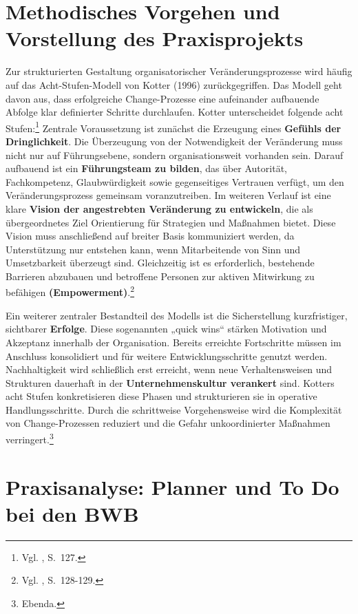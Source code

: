 \documentclass[
    12pt, 
    a4paper,
    ]{scrartcl} %
\begin{document}
\section{Methodisches Vorgehen und Vorstellung des Praxisprojekts}
Zur strukturierten Gestaltung organisatorischer Veränderungsprozesse wird häufig auf das Acht-Stufen-Modell von Kotter (1996) zurückgegriffen. Das Modell geht davon aus, dass erfolgreiche Change-Prozesse eine aufeinander aufbauende Abfolge klar definierter Schritte durchlaufen. Kotter unterscheidet folgende acht Stufen:\footnote{Vgl. \cite{Rosenstiel_ChangeManagement}, S.~127.} 
Zentrale Voraussetzung ist zunächst die Erzeugung eines \textbf{Gefühls der Dringlichkeit}. Die Überzeugung von der Notwendigkeit der Veränderung muss nicht nur auf Führungsebene, sondern organisationsweit vorhanden sein. Darauf aufbauend ist ein \textbf{Führungsteam zu bilden}, das über Autorität, Fachkompetenz, Glaubwürdigkeit sowie gegenseitiges Vertrauen verfügt, um den Veränderungsprozess gemeinsam voranzutreiben.
Im weiteren Verlauf ist eine klare \textbf{Vision der angestrebten Veränderung zu entwickeln}, die als übergeordnetes Ziel Orientierung für Strategien und Maßnahmen bietet. Diese Vision muss anschließend auf breiter Basis kommuniziert werden, da Unterstützung nur entstehen kann, wenn Mitarbeitende von Sinn und Umsetzbarkeit überzeugt sind. Gleichzeitig ist es erforderlich, bestehende Barrieren abzubauen und betroffene Personen zur aktiven Mitwirkung zu befähigen \textbf{(Empowerment)}.\footnote{Vgl. \cite{Rosenstiel_ChangeManagement}, S.~128-129.} 

Ein weiterer zentraler Bestandteil des Modells ist die Sicherstellung kurzfristiger, sichtbarer \textbf{Erfolge}. Diese sogenannten „quick wins“ stärken Motivation und Akzeptanz innerhalb der Organisation. Bereits erreichte Fortschritte müssen im Anschluss konsolidiert und für weitere Entwicklungsschritte genutzt werden. Nachhaltigkeit wird schließlich erst erreicht, wenn neue Verhaltensweisen und Strukturen dauerhaft in der \textbf{Unternehmenskultur verankert} sind. Kotters acht Stufen konkretisieren diese Phasen und strukturieren sie in operative Handlungsschritte. Durch die schrittweise Vorgehensweise wird die Komplexität von Change-Prozessen reduziert und die Gefahr unkoordinierter Maßnahmen verringert.\footnote{Ebenda.}

\section{Praxisanalyse: Planner und To Do bei den BWB}
\end{document}
